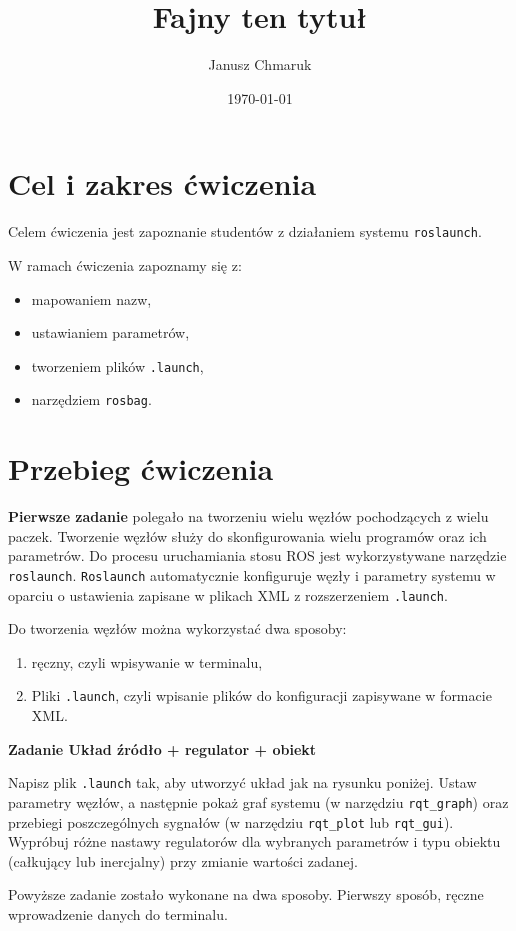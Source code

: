 \documentclass[10pt,a4paper,twoside,twocolumn]{article}%
\title{Fajny ten tytuł}%
\date{\today}%
\author{Janusz Chmaruk}%
\newcounter{zadanie}
\begin{document}
\null

\newpage

\tableofcontents

\section{Cel i zakres ćwiczenia}
Celem ćwiczenia jest zapoznanie studentów z działaniem systemu \texttt{roslaunch}.

W ramach ćwiczenia zapoznamy się z:
\begin{itemize}
    \item mapowaniem nazw,
    \item ustawianiem parametrów,
    \item tworzeniem plików \texttt{.launch},
    \item narzędziem \texttt{rosbag}.
\end{itemize}

\section{Przebieg ćwiczenia}
\textbf{Pierwsze zadanie} polegało na tworzeniu wielu węzłów pochodzących z wielu paczek. Tworzenie węzłów służy do skonfigurowania wielu programów oraz ich parametrów. Do procesu uruchamiania stosu ROS jest wykorzystywane narzędzie \texttt{roslaunch}. \texttt{Roslaunch} automatycznie konfiguruje węzły i parametry systemu w oparciu o ustawienia zapisane w plikach XML z rozszerzeniem \texttt{.launch}.

Do tworzenia węzłów można wykorzystać dwa sposoby:
\begin{enumerate}
    \item ręczny, czyli wpisywanie w terminalu,
    \item Pliki \texttt{.launch}, czyli wpisanie plików do konfiguracji zapisywane w formacie XML.
\end{enumerate}

\textbf{Zadanie Układ źródło + regulator + obiekt}

Napisz plik \texttt{.launch} tak, aby utworzyć układ jak na rysunku poniżej. Ustaw parametry węzłów, a następnie pokaż graf systemu (w narzędziu \texttt{rqt\_graph}) oraz przebiegi poszczególnych sygnałów (w narzędziu \texttt{rqt\_plot} lub \texttt{rqt\_gui}). Wypróbuj różne nastawy regulatorów dla wybranych parametrów i typu obiektu (całkujący lub inercjalny) przy zmianie wartości zadanej.

Powyższe zadanie zostało wykonane na dwa sposoby. Pierwszy sposób, ręczne wprowadzenie danych do terminalu.
\end{document}

